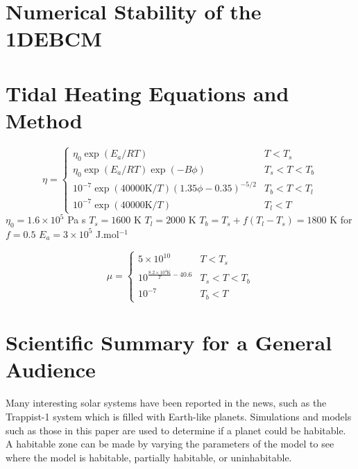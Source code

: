 \documentclass[12pt, onecolumn]{revtex4-2}    %
\begin{document}



\clearpage

\appendix

\section{Numerical Stability of the 1DEBCM} \label{appx:NumStability}

\section{Tidal Heating Equations and Method} \label{appx:TidalHeatingEquationsMethod}
\begin{equation}
  \eta = 
  \begin{cases}
    \eta_0 \exp{(E_a / R T)} & T < T_s \\
    \eta_0 \exp{(E_a / R T)} \exp{(-B \phi)} & T_s < T < T_b \\
    10^{-7} \exp{(40000\text{K} / T)} (1.35 \phi - 0.35)^{-5/2} & T_b < T < T_l \\
    10^{-7} \exp{(40000\text{K} / T)} & T_l < T
  \end{cases}
\end{equation}
$\eta_0 = 1.6 \times 10^5$ Pa s
$T_s = 1600$ K
$T_l = 2000$ K
$T_b = T_s + f (T_l - T_s) = 1800$ K for $f=0.5$
$E_a = 3\times10^5$ J.mol$^{-1}$

\begin{equation}
  \mu = 
  \begin{cases}
    5\times10^{10} & T < T_s \\
    10^{\frac{8.2\times10^4\text{K}}{T} - 40.6} & T_s < T < T_b \\
    10^{-7} & T_b < T
  \end{cases}
\end{equation}

\clearpage

\section*{Scientific Summary for a General Audience}

Many interesting solar systems have been reported in the news, such as the Trappist-1 system which is filled with Earth-like planets.
Simulations and models such as those in this paper are used to determine if a planet could be habitable.
A habitable zone can be made by varying the parameters of the model to see where the model is habitable, partially habitable, or uninhabitable.
\end{document}
